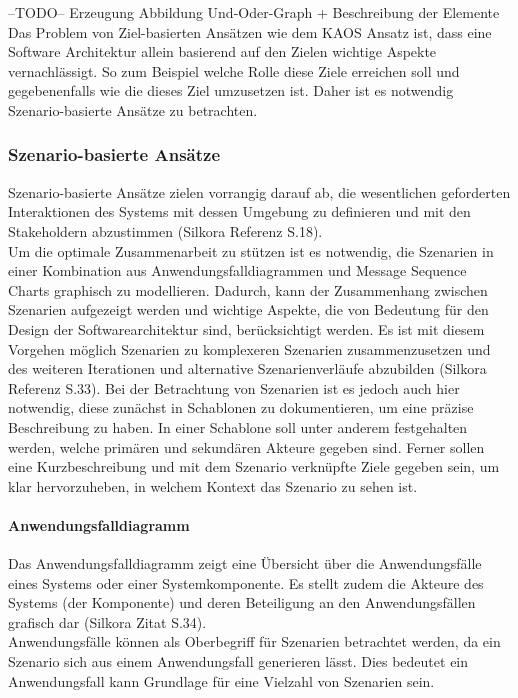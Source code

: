 --TODO-- Erzeugung Abbildung Und-Oder-Graph + Beschreibung der Elemente\\

Das Problem von Ziel-basierten Ans\"atzen wie dem KAOS Ansatz ist, dass eine Software Architektur allein basierend auf den Zielen wichtige Aspekte vernachl\"assigt. So zum Beispiel welche Rolle diese Ziele erreichen soll und gegebenenfalls wie die dieses Ziel umzusetzen ist. Daher ist es notwendig Szenario-basierte Ans\"atze zu betrachten.

\subsubsection{Szenario-basierte Ans\"atze}
Szenario-basierte Ans\"atze zielen vorrangig darauf ab, die wesentlichen geforderten Interaktionen des Systems mit dessen Umgebung zu definieren und mit den Stakeholdern abzustimmen (Silkora Referenz S.18).\\
Um die optimale Zusammenarbeit zu st\"utzen ist es notwendig, die Szenarien in einer Kombination aus Anwendungsfalldiagrammen und Message Sequence Charts graphisch zu modellieren. Dadurch, kann der Zusammenhang zwischen Szenarien aufgezeigt werden und wichtige Aspekte, die von Bedeutung f\"ur den Design der Softwarearchitektur sind, ber\"ucksichtigt werden. Es ist mit diesem Vorgehen m\"oglich Szenarien zu komplexeren Szenarien zusammenzusetzen und des weiteren Iterationen und alternative Szenarienverl\"aufe abzubilden (Silkora Referenz S.33). Bei der Betrachtung von Szenarien ist es jedoch auch hier notwendig, diese zun\"achst in Schablonen zu dokumentieren, um eine pr\"azise Beschreibung zu haben. In einer Schablone soll unter anderem festgehalten werden, welche prim\"aren und sekund\"aren Akteure gegeben sind. Ferner sollen eine Kurzbeschreibung und mit dem Szenario verkn\"upfte Ziele gegeben sein, um klar hervorzuheben, in welchem Kontext das Szenario zu sehen ist.  
\paragraph{Anwendungsfalldiagramm}
Das Anwendungsfalldiagramm zeigt eine \"Ubersicht \"uber die Anwendungsf\"alle eines Systems oder einer Systemkomponente. Es stellt zudem die Akteure des Systems (der Komponente) und deren Beteiligung an den Anwendungsf\"allen grafisch dar (Silkora Zitat S.34). \\
Anwendungsf\"alle k\"onnen als Oberbegriff f\"ur Szenarien betrachtet werden, da ein Szenario sich aus einem Anwendungsfall generieren l\"asst. Dies bedeutet ein Anwendungsfall kann Grundlage für eine Vielzahl von Szenarien sein. \\

